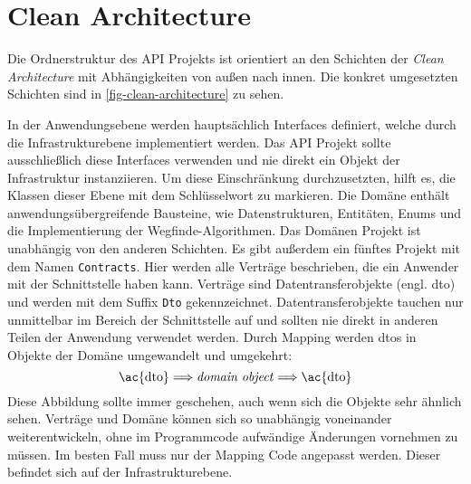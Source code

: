 \part{Clean Architecture}
Die Ordnerstruktur des API Projekts ist orientiert an den Schichten
der \textit{Clean Architecture}
mit Abhän\-gigkeiten von außen nach innen. Die konkret umgesetzten Schichten
sind in \autoref{fig-clean-architecture} zu sehen.



\noindent
In der Anwendungsebene werden hauptsächlich Interfaces definiert, welche
durch die Infrastrukturebene implementiert werden. Das API Projekt
sollte ausschließlich diese Interfaces verwenden und nie direkt
ein Objekt der Infrastruktur instanziieren.
Um diese Einschränkung durchzusetzten, hilft es,
die Klassen dieser Ebene mit dem Schlüsselwort  zu markieren.
Die Domäne enthält anwendungsübergreifende Bausteine, wie
Datenstrukturen, Entitäten, Enums und die Implementierung der Wegfinde-Algorith\-men.
Das Domänen Projekt ist unabhängig von den anderen Schichten.
Es gibt außerdem ein fünftes Projekt mit dem Namen \texttt{Contracts}. Hier
werden alle Verträge beschrieben, die ein Anwender mit der Schnittstelle
haben kann. Verträge sind Datentransferobjekte (engl. \ac{dto})
und werden mit dem Suffix \texttt{Dto} gekennzeichnet. Datentransferobjekte
tauchen nur unmittelbar im Bereich der Schnittstelle auf und
sollten nie direkt in anderen Teilen der Anwendung verwendet werden.
Durch Mapping werden \acp{dto} in Objekte der Domäne umgewandelt und umgekehrt:
\begin{equation*}
  \text{\ac{dto}} \Longrightarrow \text{\textit{domain object}} \Longrightarrow \text{\ac{dto}}
\end{equation*}
Diese Abbildung sollte immer geschehen, auch wenn sich die Objekte
sehr ähnlich sehen.
Verträge und Domäne können sich so unabhängig voneinander weiterentwickeln,
ohne im Programmcode aufwändige Änderungen vornehmen zu müssen.
Im besten Fall muss nur der Mapping Code angepasst werden.
Dieser befindet sich auf der Infrastrukturebene.